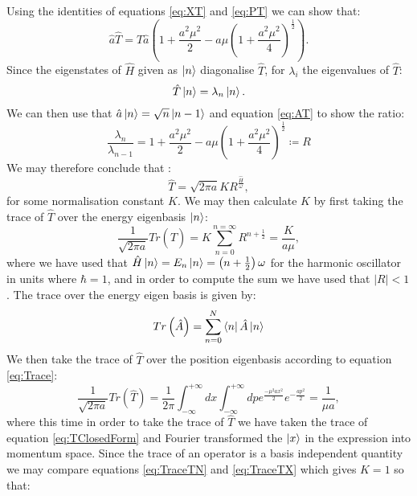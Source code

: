 \documentclass[12pt]{article}
\begin{document}
Using the identities of equations \ref{eq:XT} and \ref{eq:PT} we can show that:
\begin{equation}
	\label{eq:AT}
	\hat{a}\hat{T} = \hat{T}\hat{a}\left( 1 + \frac{a^2\mu^2}{2} - a\mu\left( 1 + \frac{a^2\mu^2}{4}\right)^\frac{1}{2} \right).
\end{equation}
Since the eigenstates of $\hat{H}$ given as $\ket{n}$ diagonalise $\hat{T}$, for $\lambda_i$ the eigenvalues of $\hat{T}$:
\begin{equation}
	\label{eq:TEigenstates}
	\hat{T}\ket{n} = \lambda_n \ket{n}.
\end{equation}
We can then use that $\hat{a}\ket{n} = \sqrt{n}\ket{n-1}$ and equation \ref{eq:AT} to show the ratio:
\begin{equation}
	\label{eq:EigenRatio}
	\frac{\lambda_n}{\lambda_{n-1}} = 1 + \frac{a^2\mu^2}{2} - a\mu\left( 1 + \frac{a^2\mu^2}{4}\right)^{\frac{1}{2}} \coloneqq R
\end{equation}
We may therefore conclude that :
\begin{equation}
	\label{eq:TWithK}
	\hat{T} = \sqrt{2\pi a}KR^{\frac{\hat{H}}{\omega}},
\end{equation}
for some normalisation constant $K$. We may then calculate $K$ by first taking the trace of $\hat{T}$ over the energy eigenbasis $\ket{n}$:
\begin{equation}
	\label{eq:TraceTN}
	\frac{1}{\sqrt{2\pi a}} Tr{\left(\hat{T}\right)} = K \sum_{n=0}^{n=\infty} R^{n+\frac{1}{2}} = \frac{K}{a\mu},
\end{equation}
where we have used that $\hat{H}\ket{n} = E_n\ket{n} = \left(n+\frac{1}{2}\right)\omega$ for the harmonic oscillator in units where $\hbar=1$, and in order to compute the sum we have used that $|R| < 1$. The trace over the energy eigen basis is given by:
\begin{equation}
	\label{eq:EnergyTrace}
	Tr\left(\hat{A}\right) = \sum_{n=0}^{N}\bra{n}\hat{A}\ket{n}
\end{equation}
We then take the trace of $\hat{T}$ over the position eigenbasis according to equation \ref{eq:Trace}:
\begin{equation}
	\label{eq:TraceTX}
	\frac{1}{\sqrt{2\pi a}} Tr{\left(\hat{T}\right)} = \frac{1}{2\pi}\int_{-\infty}^{+\infty}dx\int_{-\infty}^{+\infty}dp e^{\frac{-\mu^2ax^2}{2}}e^{-\frac{ap^2}{2}} = \frac{1}{\mu a},
\end{equation}
where this time in order to take the trace of $\hat{T}$ we have taken the trace of equation \ref{eq:TClosedForm} and Fourier transformed the $\ket{x}$ in the expression into momentum space. Since the trace of an operator is a basis independent quantity we may compare equations \ref{eq:TraceTN} and \ref{eq:TraceTX} which gives $K=1$ so that:
\end{document}
